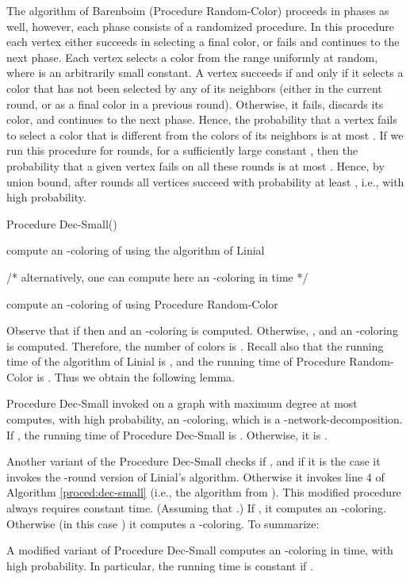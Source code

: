 \documentclass[11pt]{article}
\begin{document}
The algorithm of Barenboim \cite{B12} (Procedure Random-Color) proceeds in phases as well, however, each phase consists of a randomized procedure. In this procedure each vertex either succeeds in selecting a final color, or fails and continues to the next phase. Each vertex selects a color from the range  uniformly at random, where  is an arbitrarily small constant. A vertex succeeds if and only if it selects a color that has not been selected by any of its neighbors (either in the current round, or as a final color in a previous round). Otherwise, it fails, discards its color, and continues to the next phase. Hence, the probability that a vertex  fails
 to select a color that is different from the colors of its neighbors is at most . 
If we run this procedure for  rounds, for a sufficiently large constant , then the probability that a given vertex  fails on all these rounds is at most . Hence, by union bound, after  rounds all vertices succeed with probability at least , i.e., with high probability.
\begin{algorithm}[H]
\caption{Procedure Dec-Small()}
\label{proced:dec-small}

\begin{algorithmic}[1] 

\IF  {}
  
  \STATE compute an -coloring of  using the algorithm of Linial \cite{L92}
	
	/* alternatively, one can compute here an -coloring in  time */
  
\ELSE

  \STATE compute an -coloring of  using Procedure Random-Color
  
\ENDIF

\end{algorithmic}
\end{algorithm}

Observe that if  then  and an -coloring is computed. Otherwise, , and an -coloring is computed. Therefore, the number of colors is .
Recall also that the running time of the algorithm of Linial \cite{L92} is , and the running time of Procedure Random-Color is . Thus we obtain the following lemma.
\begin{lem} \label{dsmall}
Procedure Dec-Small invoked on a graph  with maximum degree at most  computes, with high probability, an -coloring, which is a -network-decomposition. If , the running time of Procedure Dec-Small is . Otherwise, it is .
\end{lem}
Another variant of the Procedure Dec-Small checks if , and if it is the case it invokes the -round version of Linial's algorithm. Otherwise it invokes line 4 of Algorithm \ref{proced:dec-small} (i.e., the algorithm from \cite{B12}).
This modified procedure always requires constant time. (Assuming that .) If , it computes an -coloring.
Otherwise (in this case ) it computes a -coloring. To summarize:
\begin{lem}
A modified variant of Procedure Dec-Small computes an -coloring in  time, with high probability. In particular, the running time is constant if .
\end{lem}
\end{document}
